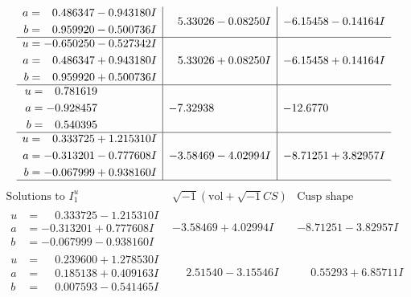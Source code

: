 \documentclass[1p]{elsarticle_modified}
\theoremstyle{definition}
\newcommand{\I}{\sqrt{-1}}
\begin{document}
$$\begin{array}{c|c|c}
\begin{aligned}
a &= \phantom{-}0.486347 - 0.943180 I \\
b &= \phantom{-}0.959920 - 0.500736 I\end{aligned}
 & \phantom{-}5.33026 - 0.08250 I & -6.15458 - 0.14164 I \\ \hline\begin{aligned}
u &= -0.650250 - 0.527342 I \\
a &= \phantom{-}0.486347 + 0.943180 I \\
b &= \phantom{-}0.959920 + 0.500736 I\end{aligned}
 & \phantom{-}5.33026 + 0.08250 I & -6.15458 + 0.14164 I \\ \hline\begin{aligned}
u &= \phantom{-}0.781619\phantom{ +0.000000I} \\
a &= -0.928457\phantom{ +0.000000I} \\
b &= \phantom{-}0.540395\phantom{ +0.000000I}\end{aligned}
 & -7.32938\phantom{ +0.000000I} & -12.6770\phantom{ +0.000000I} \\ \hline\begin{aligned}
u &= \phantom{-}0.333725 + 1.215310 I \\
a &= -0.313201 - 0.777608 I \\
b &= -0.067999 + 0.938160 I\end{aligned}
 & -3.58469 - 4.02994 I & -8.71251 + 3.82957 I\\
 \hline 
 \end{array}$$\newpage$$\begin{array}{c|c|c}  
\text{Solutions to }I^u_{1}& \I (\text{vol} + \sqrt{-1}CS) & \text{Cusp shape}\\
 \hline 
\begin{aligned}
u &= \phantom{-}0.333725 - 1.215310 I \\
a &= -0.313201 + 0.777608 I \\
b &= -0.067999 - 0.938160 I\end{aligned}
 & -3.58469 + 4.02994 I & -8.71251 - 3.82957 I \\ \hline\begin{aligned}
u &= \phantom{-}0.239600 + 1.278530 I \\
a &= \phantom{-}0.185138 + 0.409163 I \\
b &= \phantom{-}0.007593 - 0.541465 I\end{aligned}
 & \phantom{-}2.51540 - 3.15546 I & \phantom{-}0.55293 + 6.85711 I \\ \hline\begin{aligned}

\end{aligned}
\end{array}$$
\end{document}
